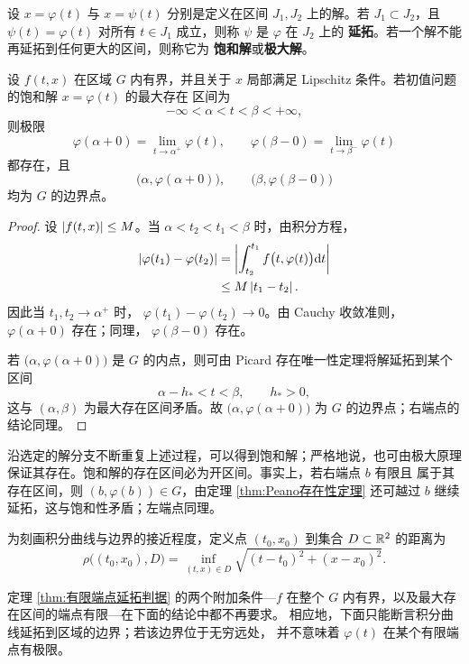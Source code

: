 \begin{definition}\label{def:解的延拓与饱和解}
	设 $x=\varphi(t)$ 与 $x=\psi(t)$ 分别是定义在区间 $J_1,J_2$
	上的解。若 $J_1\subset J_2$，且 $\psi(t)=\varphi(t)$ 对所有
	$t\in J_1$ 成立，则称 $\psi$ 是 $\varphi$ 在 $J_2$ 上的
	\textbf{延拓}。若一个解不能再延拓到任何更大的区间，则称它为
	\textbf{饱和解}或\textbf{极大解}。
\end{definition}

\begin{theorem}[有限端点延拓判据]\label{thm:有限端点延拓判据}
	设 $f(t,x)$ 在区域 $G$ 内有界，并且关于 $x$ 局部满足
	Lipschitz 条件。若初值问题的饱和解 $x=\varphi(t)$ 的最大存在
	区间为
	\[
		-\infty<\alpha<t<\beta<+\infty,
	\]
	则极限
	\[
		\varphi(\alpha+0)
		=\lim_{t\to\alpha^+}\varphi(t),
		\qquad
		\varphi(\beta-0)
		=\lim_{t\to\beta^-}\varphi(t)
	\]
	都存在，且
	\[
		\bigl(\alpha,\varphi(\alpha+0)\bigr),
		\qquad
		\bigl(\beta,\varphi(\beta-0)\bigr)
	\]
	均为 $G$ 的边界点。
\end{theorem}

\begin{proof}
	设 $\left| f(t,x) \right|\leq M$。当
	$\alpha<t_2<t_1<\beta$ 时，由积分方程，
	\[
		\begin{aligned}
		\left| \varphi(t_1)-\varphi(t_2) \right|
		&=\left| \int_{t_2}^{t_1}
		f\bigl(t,\varphi(t)\bigr)\mathrm{d} t \right|\\
		&\leq M\left| t_1-t_2 \right|.
		\end{aligned}
	\]
	因此当 $t_1,t_2\to\alpha^+$ 时，
	$\varphi(t_1)-\varphi(t_2)\to0$。由 Cauchy 收敛准则，
	$\varphi(\alpha+0)$ 存在；同理，
	$\varphi(\beta-0)$ 存在。

	若 $\bigl(\alpha,\varphi(\alpha+0)\bigr)$ 是 $G$ 的内点，则可由
	Picard 存在唯一性定理将解延拓到某个区间
	\[
		\alpha-h_*<t<\beta,
		\qquad h_*>0,
	\]
	这与 $(\alpha,\beta)$ 为最大存在区间矛盾。故
	$\bigl(\alpha,\varphi(\alpha+0)\bigr)$ 为 $G$ 的边界点；右端点的
	结论同理。
\end{proof}

沿选定的解分支不断重复上述过程，可以得到饱和解；严格地说，也可由极大原理
保证其存在。饱和解的存在区间必为开区间。事实上，若右端点 $b$ 有限且
属于其存在区间，则 $(b,\varphi(b))\in G$，由定理
\ref{thm:Peano存在性定理} 还可越过
$b$ 继续延拓，这与饱和性矛盾；左端点同理。

为刻画积分曲线与边界的接近程度，定义点 $(t_0,x_0)$ 到集合
$D\subset\mathbb{R}^2$ 的距离为
\[
	\rho\bigl((t_0,x_0),D\bigr)
	=\inf_{(t,x)\in D}
	\sqrt{(t-t_0)^2+(x-x_0)^2}.
\]

定理 \ref{thm:有限端点延拓判据} 的两个附加条件---$f$ 在整个
$G$ 内有界，以及最大存在区间的端点有限---在下面的结论中都不再要求。
相应地，下面只能断言积分曲线延拓到区域的边界；若该边界位于无穷远处，
并不意味着 $\varphi(t)$ 在某个有限端点有极限。

